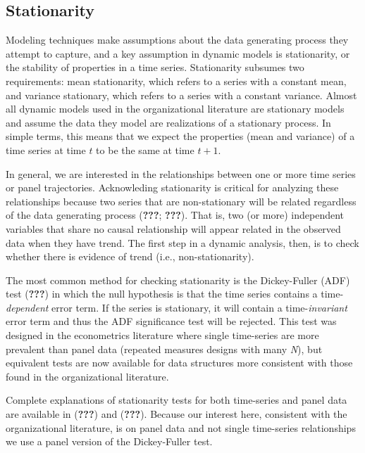 \documentclass[english,,man]{apa6}
\theoremstyle{definition}
\theoremstyle{definition}
\theoremstyle{definition}
\theoremstyle{remark}
\begin{document}
\hypertarget{stationarity}{%
\subsection{Stationarity}\label{stationarity}}

Modeling techniques make assumptions about the data generating process
they attempt to capture, and a key assumption in dynamic models is
stationarity, or the stability of properties in a time series.
Stationarity subsumes two requirements: mean stationarity, which refers
to a series with a constant mean, and variance stationary, which refers
to a series with a constant variance. Almost all dynamic models used in
the organizational literature are stationary models and assume the data
they model are realizations of a stationary process. In simple terms,
this means that we expect the properties (mean and variance) of a time
series at time \(t\) to be the same at time \(t+1\).

In general, we are interested in the relationships between one or more
time series or panel trajectories. Acknowleding stationarity is critical
for analyzing these relationships because two series that are
non-stationary will be related regardless of the data generating process
({\textbf{???}}; {\textbf{???}}). That is, two (or more) independent
variables that share no causal relationship will appear related in the
observed data when they have trend. The first step in a dynamic
analysis, then, is to check whether there is evidence of trend (i.e.,
non-stationarity).

The most common method for checking stationarity is the Dickey-Fuller
(ADF) test ({\textbf{???}}) in which the null hypothesis is that the
time series contains a time-\emph{dependent} error term. If the series
is stationary, it will contain a time-\emph{invariant} error term and
thus the ADF significance test will be rejected. This test was designed
in the econometrics literature where single time-series are more
prevalent than panel data (repeated measures designs with many
\emph{N}), but equivalent tests are now available for data structures
more consistent with those found in the organizational literature.

Complete explanations of stationarity tests for both time-series and
panel data are available in ({\textbf{???}}) and ({\textbf{???}}).
Because our interest here, consistent with the organizational
literature, is on panel data and not single time-series relationships we
use a panel version of the Dickey-Fuller test.
\end{document}

